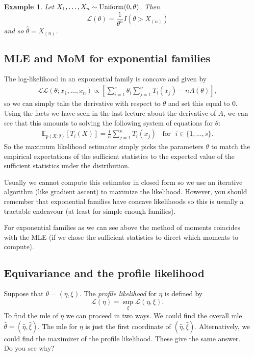 \documentclass[twoside,12pt]{article}
\newtheorem{example}[theorem]{Example}
\begin{document}
\begin{example}
Let $X_1,\ldots, X_n \sim {\rm Uniform}(0,\theta)$.
Then
$$
 \mathcal{L}(\theta) = \frac{1}{\theta^n} I(\theta > X_{(n)})
$$
and so
$\widehat\theta = X_{(n)}$.
\end{example}

\vspace{1cm}

\subsection{MLE and MoM for exponential families}
The log-likelihood in an exponential family is concave and given by
\begin{align*}
\mathcal{L}\mathcal{L}(\theta;x_1,\ldots,x_n) \propto \left[ \sum_{i=1}^s \theta_i \sum_{j=1}^n T_i(x_j) - n A(\theta)\right],
\end{align*}
so we can simply take the derivative with respect to $\theta$ and set this equal to $0$. Using the facts we have seen in the last lecture about the derivative of $A$, we can see that this amounts to solving the following system of equations for $\theta$:
\begin{align*}
\mathbb{E}_{p(X;\theta)} [T_i(X)] = \frac{1}{n} \sum_{j=1}^n T_i(x_j)~~~~\text{for}~~~i \in \{1,\ldots,s\}.
\end{align*}
So the maximum likelihood estimator simply picks the parameters $\theta$ to match the empirical expectations of the sufficient statistics to the expected value of the sufficient statistics under the distribution.

Usually we cannot compute this estimator in closed form so we use an iterative algorithm (like gradient ascent) to maximize the likelihood. However, you should remember that exponential families have concave likelihoods so this is usually a tractable endeavour (at least for simple enough families).

For exponential families as we can see above the method of moments coincides with the MLE (if we chose the sufficient statistics to direct which moments to compute).


\subsection{Equivariance and the profile likelihood}

Suppose that
$\theta = (\eta,\xi)$.
The {\em profile likelihood} for $\eta$ is defined by
$$
 \mathcal{L}(\eta) = \sup_\xi  \mathcal{L}(\eta,\xi).
$$
To find the mle of $\eta$ we can proceed in two ways.
We could find the overall mle $\widehat\theta = (\widehat\eta,\widehat\xi)$.
The mle for $\eta$ is just the first coordinate of 
$(\widehat\eta,\widehat\xi)$.
Alternatively, we could find the maximizer of the
profile likelihood.
These give the same answer.
Do you see why?
\end{document}
